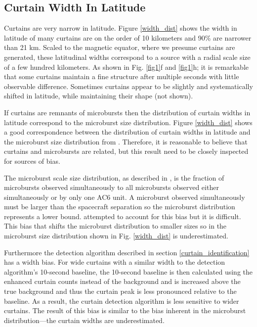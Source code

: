 \documentclass[draft]{agujournal2019}
\begin{document}
\subsection{Curtain Width In Latitude}
Curtains are very narrow in latitude. Figure \ref{width_dist} shows the width in latitude of many curtains are on the order of 10 kilometers and 90\% are narrower than 21 km. Scaled to the magnetic equator, where we presume curtains are generated, these latitudinal widths correspond to a source with a radial scale size of a few hundred kilometers. As shown in Fig. \ref{fig1}f and \ref{fig1}h; it is remarkable that some curtains maintain a fine structure after multiple seconds with little observable difference. Sometimes curtains appear to be slightly and systematically shifted in latitude, while maintaining their shape (not shown).

If curtains are remnants of microbursts then the distribution of curtain widths in latitude correspond to the microburst size distribution. Figure \ref{width_dist} shows a good correspondence between the distribution of curtain widths in latitude and the microburst size distribution from . Therefore, it is reasonable to believe that curtains and microbursts are related, but this result need to be closely inspected for sources of bias. 

The microburst scale size distribution, as described in , is the fraction of microbursts observed simultaneously to all microbursts observed either simultaneously or by only one AC6 unit. A microburst observed simultaneously must be larger than the spacecraft separation so the microburst distribution represents a lower bound.  attempted to account for this bias but it is difficult. This bias that shifts the microburst distribution to smaller sizes so in the microburst size distribution shown in Fig. \ref{width_dist} is underestimated.

Furthermore the detection algorithm described in section \ref{curtain_identification} has a width bias. For wide curtains with a similar width to the detection algorithm's 10-second baseline, the 10-second baseline is then calculated using the enhanced curtain counts instead of the background and is increased above the true background and thus the curtain peak is less pronounced relative to the baseline. As a result, the curtain detection algorithm is less sensitive to wider curtains. The result of this bias is similar to the bias inherent in the microburst distribution---the curtain widths are underestimated.
\end{document}
